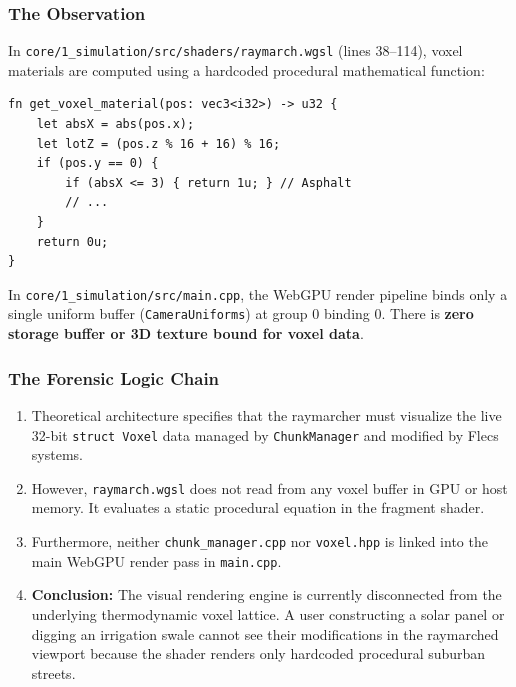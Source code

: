 \subsubsection{The Observation}
In \texttt{core/1\_simulation/src/shaders/raymarch.wgsl} (lines 38--114), voxel materials are computed using a hardcoded procedural mathematical function:
\begin{verbatim}
fn get_voxel_material(pos: vec3<i32>) -> u32 {
    let absX = abs(pos.x);
    let lotZ = (pos.z % 16 + 16) % 16;
    if (pos.y == 0) {
        if (absX <= 3) { return 1u; } // Asphalt
        // ...
    }
    return 0u;
}
\end{verbatim}
In \texttt{core/1\_simulation/src/main.cpp}, the WebGPU render pipeline binds only a single uniform buffer (\texttt{CameraUniforms}) at group 0 binding 0. There is \textbf{zero storage buffer or 3D texture bound for voxel data}.

\subsubsection{The Forensic Logic Chain}
\begin{enumerate}
    \item Theoretical architecture specifies that the raymarcher must visualize the live 32-bit \texttt{struct Voxel} data managed by \texttt{ChunkManager} and modified by Flecs systems.
    \item However, \texttt{raymarch.wgsl} does not read from any voxel buffer in GPU or host memory. It evaluates a static procedural equation in the fragment shader.
    \item Furthermore, neither \texttt{chunk\_manager.cpp} nor \texttt{voxel.hpp} is linked into the main WebGPU render pass in \texttt{main.cpp}.
    \item \textbf{Conclusion:} The visual rendering engine is currently disconnected from the underlying thermodynamic voxel lattice. A user constructing a solar panel or digging an irrigation swale cannot see their modifications in the raymarched viewport because the shader renders only hardcoded procedural suburban streets.
\end{enumerate}

